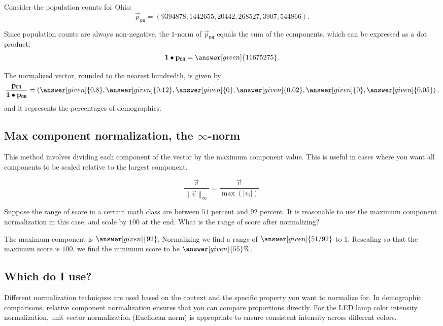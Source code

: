 \documentclass{ximera}
\begin{document}
\begin{example}
  Consider the population counts for Ohio:
  \[
    \vec{p}_{\texttt{OH}}
    = (9394878, 1442655, 20442, 268527, 3907, 544866).
  \]

  Since population counts are always non-negative, the $1$-norm of
  $\vec{p}_{\mathtt{OH}}$ equals the sum of the components, which can be
  expressed as a dot product:
  \[
    \vec{1}\dotp\vec{p}_{\texttt{OH}}
    = \answer[given]{11675275}.
  \]

  The normalized vector, rounded to the nearest hundredth, is given by
  \[
    \frac{\vec{p}_{\texttt{OH}}}{\vec{1}\dotp\vec{p}_{\texttt{OH}}}
    = \left(\answer[given]{0.8}, \answer[given]{0.12}, \answer[given]{0}, \answer[given]{0.02}, \answer[given]{0}, \answer[given]{0.05}\right),
  \]
  and it represents the percentages of demographics.
\end{example}



\subsection{Max component normalization, the $\infty$-norm}

This method involves dividing each component of the vector by the
maximum component value. This is useful in cases where you want all
components to be scaled relative to the largest component.

\[
  \frac{\vec{v}}{\|\vec{v}\|_\infty} = \frac{\vec{v}}{\max(|v_i|)}.
\]

\begin{example}
  Suppose the range of score in a certain math class are between $51$
  percent and $92$ percent. It is reasonable to use the maximum
  component normalization in this case, and scale by $100$ at the
  end. What is the range of score after normalizing?
  \begin{explanation}
    The maximum component is $\answer[given]{92}$. Normalizing we find a
    range of $\answer[given]{51/92}$ to $1$. Rescaling so that the
    maximum score is $100$, we find the minimum score to be
    $\answer[given]{55}\%$.
  \end{explanation}
\end{example}



\subsection{Which do I use?}
Different normalization techniques are used based on the context and
the specific property you want to normalize for. In demographic
comparisons, relative component normalization ensures that you can
compare proportions directly. For the LED lamp color intensity
normalization, unit vector normalization (Euclidean norm) is
appropriate to ensure consistent intensity across different colors.
\end{document}
